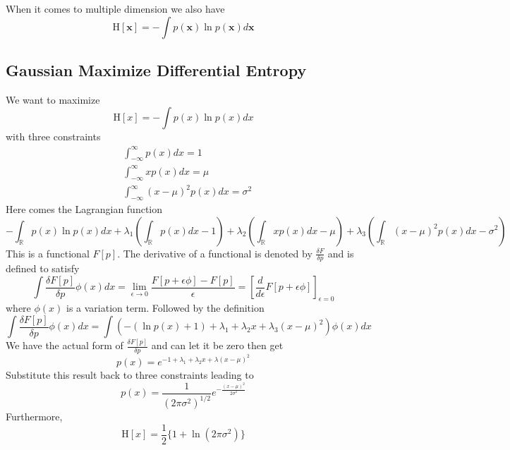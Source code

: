 \documentclass[../main.tex]{subfiles}
\begin{document}
            When it comes to multiple dimension we also have
            \[
                \mathrm{H}[\mathbf{x}]=-\int p(\mathbf{x})\ln p(\mathbf{x})d\mathbf{x}
            \]
        \subsection{Gaussian Maximize Differential Entropy}
            We want to maximize
            \[
                \mathrm{H}[x]=-\int p(x)\ln p(x)dx
            \]
            with three constraints
            \begin{align*}
                &\int_{-\infty}^\infty p(x)dx=1\\
                &\int_{-\infty}^\infty xp(x)dx=\mu\\
                &\int_{-\infty}^\infty (x-\mu)^2p(x)dx=\sigma^2
            \end{align*}
            Here comes the Lagrangian function
            \[
                -\int_{\mathbb{R}}p(x)\ln p(x)dx + \lambda_1\left(\int_{\mathbb{R}}p(x)dx-1\right) + \lambda_2\left(\int_{\mathbb{R}}xp(x)dx-\mu\right)+\lambda_3\left(\int_{\mathbb{R}}(x-\mu)^2p(x)dx-\sigma^2\right)
            \]
            This is a functional $F[p]$. The derivative of a functional is denoted by $\frac{\delta F}{\delta p}$ and is defined to satisfy
            \[
                \int\frac{\delta F[p]}{\delta p}\phi(x)dx = \lim_{\epsilon\rightarrow0}\frac{F[p+\epsilon\phi]-F[p]}{\epsilon}=\left[\frac{d}{d\epsilon}F[p+\epsilon\phi]\right]_{\epsilon=0}
            \]
            where $\phi(x)$ is a variation term. Followed by the definition
            \[
                \int\frac{\delta F[p]}{\delta p}\phi(x)dx=\int\left(-(\ln p(x)+1)+\lambda_1+\lambda_2x+\lambda_3(x-\mu)^2\right)\phi(x)dx
            \]
            We have the actual form of $\frac{\delta F[p]}{\delta p}$ and can let it be zero then get
            \[
                p(x)=e^{-1+\lambda_1+\lambda_2x+\lambda(x-\mu)^2}
            \]
            Substitute this result back to three constraints leading to
            \[
                p(x)=\frac{1}{(2\pi\sigma^2)^{1/2}}e^{-\frac{(x-\mu)^2}{2\sigma^2}}
            \]
            Furthermore,
            \[
                \mathrm{H}[x] = \frac{1}{2}\{1+\ln(2\pi\sigma^2)\}
            \]
        
\end{document}
